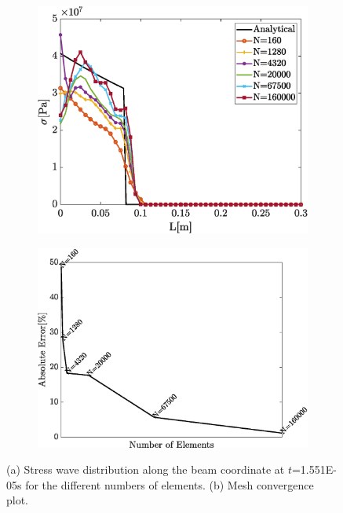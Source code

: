 \documentclass{article}
\begin{document}
\begin{figure}[!]
    \centering
        \begin{subfigure}{0.65\textwidth}
            \includegraphics[width=1\linewidth]{figures/stress_mesh_study.eps} 
            \caption{}
            \label{fig:stress_distribution}
        \end{subfigure}
        
        \begin{subfigure}{0.7\textwidth}
            \includegraphics[width=1\linewidth]{figures/mesh_study.eps} 
            \caption{}
            \label{fig:mesh_convergence}
        \end{subfigure}
    \caption{(a) Stress wave distribution along the beam coordinate at $t$=1.551E-05s for the different numbers of elements. (b) Mesh convergence plot.}
\end{figure}
\end{document}
